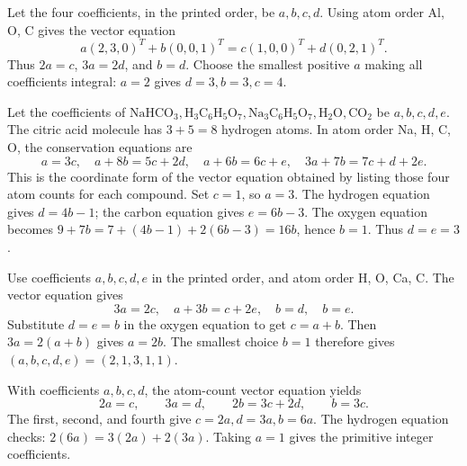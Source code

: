 Let the four coefficients, in the printed order, be $a,b,c,d$.
Using atom order Al, O, C gives the vector equation
\[a(2,3,0)^T+b(0,0,1)^T=c(1,0,0)^T+d(0,2,1)^T.\]
Thus $2a=c$, $3a=2d$, and $b=d$. Choose the smallest positive
$a$ making all coefficients integral: $a=2$ gives $d=3,b=3,c=4$.

Let the coefficients of
$\mathrm{NaHCO}_3,\mathrm H_3\mathrm C_6\mathrm H_5\mathrm O_7,
\mathrm{Na}_3\mathrm C_6\mathrm H_5\mathrm O_7,\mathrm H_2\mathrm O,
\mathrm{CO}_2$ be $a,b,c,d,e$.
The citric acid molecule has $3+5=8$ hydrogen atoms.
In atom order Na, H, C, O, the conservation equations are
\[a=3c,\quad a+8b=5c+2d,\quad a+6b=6c+e,
\quad3a+7b=7c+d+2e.\]
This is the coordinate form of the vector equation obtained by
listing those four atom counts for each compound.
Set $c=1$, so $a=3$. The hydrogen equation gives $d=4b-1$;
the carbon equation gives $e=6b-3$. The oxygen equation becomes
$9+7b=7+(4b-1)+2(6b-3)=16b$, hence $b=1$.
Thus $d=e=3$.

Use coefficients $a,b,c,d,e$ in the printed order, and atom order
H, O, Ca, C. The vector equation gives
\[3a=2c,\quad a+3b=c+2e,\quad b=d,\quad b=e.\]
Substitute $d=e=b$ in the oxygen equation to get $c=a+b$.
Then $3a=2(a+b)$ gives $a=2b$. The smallest choice $b=1$
therefore gives $(a,b,c,d,e)=(2,1,3,1,1)$.

With coefficients $a,b,c,d$, the atom-count vector equation yields
\[2a=c,\qquad3a=d,\qquad2b=3c+2d,\qquad b=3c.\]
The first, second, and fourth give $c=2a,d=3a,b=6a$.
The hydrogen equation checks: $2(6a)=3(2a)+2(3a)$.
Taking $a=1$ gives the primitive integer coefficients.

